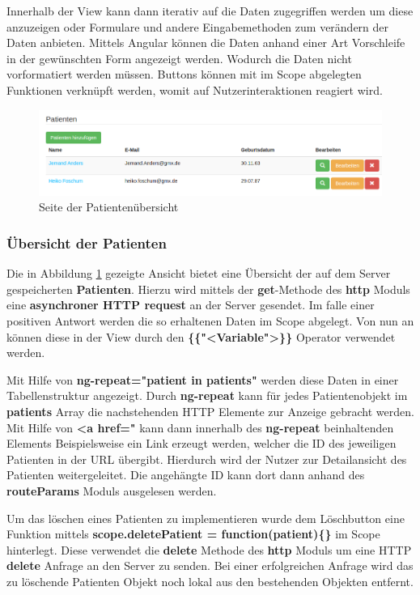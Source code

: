 Innerhalb der View kann dann iterativ auf die Daten zugegriffen werden um diese anzuzeigen oder Formulare und andere Eingabemethoden zum verändern der Daten anbieten.
Mittels Angular können die Daten anhand einer Art Vorschleife in der gewünschten Form angezeigt werden. Wodurch die Daten nicht vorformatiert werden müssen.
Buttons können mit im Scope abgelegten Funktionen verknüpft werden, womit auf Nutzerinteraktionen reagiert wird.
\begin{figure}[H]
	\centering
	\includegraphics[scale=0.4]{images/Screenshots/PatientenUebersicht}
	\caption[Seite der Patientenübersicht]{Seite der Patientenübersicht}
	\label{PatientenUebersicht}
\end{figure}

\subsubsection{Übersicht der Patienten}\label{_ImpTCPatientUebersicht}
Die in Abbildung \ref{PatientenUebersicht} gezeigte Ansicht bietet eine Übersicht der auf dem Server gespeicherten \textbf{Patienten}. Hierzu wird mittels der \textbf{get}-Methode des \textbf{http} Moduls eine \textbf{asynchroner HTTP request} an der Server gesendet. Im falle einer positiven Antwort werden die so erhaltenen Daten im Scope abgelegt. Von nun an können diese in der View durch den \textbf{\{\{"<Variable">\}\}} Operator verwendet werden.

Mit Hilfe von \textbf{ng-repeat="patient in patients"} werden diese Daten in einer Tabellenstruktur angezeigt. Durch \textbf{ng-repeat} kann für jedes Patientenobjekt im \textbf{patients} Array die nachstehenden HTTP Elemente zur Anzeige gebracht werden. Mit Hilfe von \textbf{<a href=" } kann dann innerhalb des \textbf{ng-repeat} beinhaltenden Elements Beispielsweise ein Link erzeugt werden, welcher die ID des jeweiligen Patienten in der URL übergibt. Hierdurch wird der Nutzer zur Detailansicht des Patienten weitergeleitet. Die angehängte ID kann dort dann anhand des \textbf{routeParams} Moduls ausgelesen werden. 

Um das löschen eines Patienten zu implementieren wurde dem Löschbutton eine Funktion mittels \textbf{scope.deletePatient = function(patient)\{\}} im Scope hinterlegt. Diese verwendet die \textbf{delete} Methode des \textbf{http} Moduls um eine HTTP \textbf{delete} Anfrage an den Server zu senden. Bei einer erfolgreichen Anfrage wird das zu löschende Patienten Objekt noch lokal aus den bestehenden Objekten entfernt.

